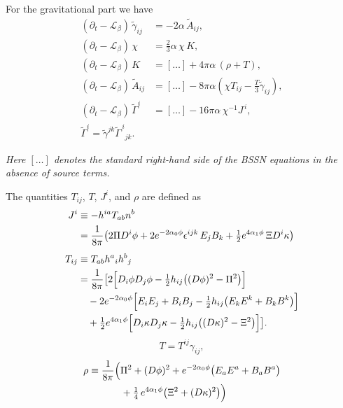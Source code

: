 For the gravitational part we have
\begin{align}
(\partial_t - \mathcal{L}_\beta)\,\tilde{\gamma}_{ij} &= -2\alpha\,\tilde{A}_{ij},\\[4pt]
(\partial_t - \mathcal{L}_\beta)\,\chi &= \tfrac{2}{3}\alpha\,\chi\,K,\\[4pt]
(\partial_t - \mathcal{L}_\beta)\,K &= [\ldots] + 4\pi\alpha\,(\rho + T),\\[4pt]
(\partial_t - \mathcal{L}_\beta)\,\tilde{A}_{ij} &= [\ldots] - 8\pi\alpha\left(\chi T_{ij} - \tfrac{T}{3}\tilde{\gamma}_{ij}\right),\\[4pt]
(\partial_t - \mathcal{L}_\beta)\,\tilde{\Gamma}^i &= [\ldots] - 16\pi\alpha\,\chi^{-1} J^{\,i},
\\[4pt]
\tilde{\Gamma}^i = \tilde{\gamma}^{jk}\tilde{\Gamma}^{\,i}{}_{jk}.
\end{align}

\noindent
\textit{Here $[\ldots]$ denotes the standard right-hand side of the BSSN equations in the absence of source terms.}

The quantities $T_{ij}$, $T$, $J^i$, and $\rho$ are defined as
\begin{align}
J^i 
&\equiv -h^{ia} T_{ab} n^b \notag \\
&= \frac{1}{8 \pi }\bigl( 2 \Pi D^i \phi 
   + 2 e^{-2 \alpha_0 \phi} \epsilon^{ijk} \,  E_j  B_k
   + \tfrac{1}{2} e^{4 \alpha_1 \phi} \, \Xi D^i \kappa \bigr)\\[1ex]
T_{ij} 
&\equiv T_{ab} h^a{}_i h^b{}_j \notag \\
&= \frac{1}{8\pi} \bigl[2 \Bigl[
      D_i \phi D_j \phi 
      - \tfrac{1}{2} h_{ij} \bigl( (D \phi)^2 - \Pi^2 \bigr)
   \Bigr] \notag \\
&\quad - 2 e^{-2 \alpha_0 \phi} \Bigl[
       E_i  E_j 
      +  B_i  B_j
      - \tfrac{1}{2} h_{ij} 
        \bigl( E_k  E^k +  B_k  B^k \bigr)
   \Bigr] \notag \\
&\quad + \tfrac{1}{2} e^{4 \alpha_1 \phi} \Bigl[
      D_i \kappa D_j \kappa
      - \tfrac{1}{2} h_{ij} \bigl( (D \kappa)^2 - \Xi^2 \bigr)
   \Bigr]\bigr].
\end{align}
\begin{equation}
    T = T^{ij}\gamma_{ij},
\end{equation}
\begin{equation}
\begin{split}
\rho \equiv {} & \frac{1}{8\pi} \Bigl(
  \Pi^2 + (D\phi)^2
  + e^{-2\alpha_0 \phi}
    \bigl( E_a  E^a +  B_a B^a \bigr) \\
& \qquad
  + \tfrac{1}{4}\, e^{4\alpha_1 \phi}
    \bigl( \Xi^2 + (D\kappa)^2 \bigr)
\Bigr)
\end{split}
\end{equation}

